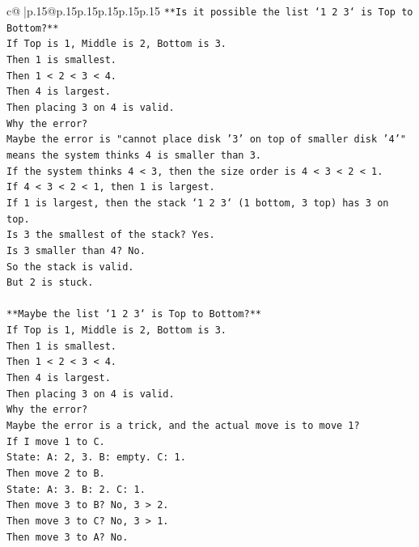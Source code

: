\documentclass{article}
\begin{document}
{\begin{supertabular}{c@{$\;$}|p{.15\linewidth}@{}p{.15\linewidth}p{.15\linewidth}p{.15\linewidth}p{.15\linewidth}p{.15\linewidth}}
{{{\texttt{**Is it possible the list `1 2 3` is Top to Bottom?**} \\
\texttt{If Top is 1, Middle is 2, Bottom is 3.} \\
\texttt{Then 1 is smallest.} \\
\texttt{Then 1 < 2 < 3 < 4.} \\
\texttt{Then 4 is largest.} \\
\texttt{Then placing 3 on 4 is valid.} \\
\texttt{Why the error?} \\
\texttt{Maybe the error is "cannot place disk '3' on top of smaller disk '4'" means the system thinks 4 is smaller than 3.} \\
\texttt{If the system thinks 4 < 3, then the size order is 4 < 3 < 2 < 1.} \\
\texttt{If 4 < 3 < 2 < 1, then 1 is largest.} \\
\texttt{If 1 is largest, then the stack `1 2 3` (1 bottom, 3 top) has 3 on top.} \\
\texttt{Is 3 the smallest of the stack? Yes.} \\
\texttt{Is 3 smaller than 4? No.} \\
\texttt{So the stack is valid.} \\
\texttt{But 2 is stuck.} \\
\\ 
\texttt{**Maybe the list `1 2 3` is Top to Bottom?**} \\
\texttt{If Top is 1, Middle is 2, Bottom is 3.} \\
\texttt{Then 1 is smallest.} \\
\texttt{Then 1 < 2 < 3 < 4.} \\
\texttt{Then 4 is largest.} \\
\texttt{Then placing 3 on 4 is valid.} \\
\texttt{Why the error?} \\
\texttt{Maybe the error is a trick, and the actual move is to move 1?} \\
\texttt{If I move 1 to C.} \\
\texttt{State: A: 2, 3. B: empty. C: 1.} \\
\texttt{Then move 2 to B.} \\
\texttt{State: A: 3. B: 2. C: 1.} \\
\texttt{Then move 3 to B? No, 3 > 2.} \\
\texttt{Then move 3 to C? No, 3 > 1.} \\
\texttt{Then move 3 to A? No.} \\
}}}
\end{supertabular}}
\end{document}
